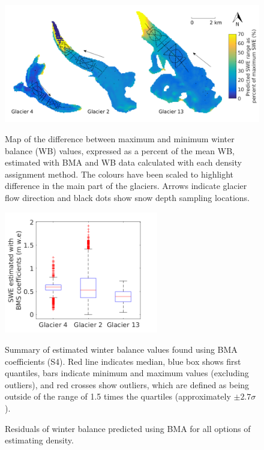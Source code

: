 \documentclass{sfuthesis}
\newcommand{\boxMatlab}{Red line indicates median, blue box shows first quantiles, bars indicate minimum and maximum values (excluding outliers), and red crosses show outliers, which are defined as being outside of the range of 1.5 times the quartiles (approximately $\pm2.7\sigma$). }
\newcommand{\topomap}{Arrows indicate glacier flow direction and black dots show snow depth sampling locations. }
\begin{document}
 \begin{figure}[H]
	\centering
	\includegraphics[width =\textwidth]{BMS_SWEdifferenceMap_percent.png}\\
	\caption{Map of the difference between maximum and minimum winter balance (WB) values, expressed as a percent of the mean WB, estimated with BMA and WB data calculated with each density assignment method. The colours have been scaled to highlight difference in the main part of the glaciers. \topomap}
	\label{fig:BMS_SWEdiffMap_precent}
\end{figure} 

\begin{figure}[H]
\centering
	\includegraphics[width =0.6\textwidth]{ModelledSWE_box_BMS.png}\\
\caption{Summary of estimated winter balance values found using BMA coefficients (S4). \boxMatlab}
\label{fig:BMAsweboxplot}
\end{figure} 

\begin{figure}[H]
	\caption{Residuals of winter balance predicted using BMA for all options of estimating density.}
	\label{fig:BMSresiduals_all}
\end{figure}
\end{document}
